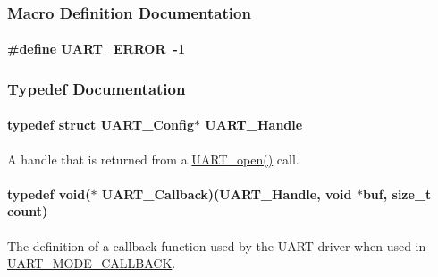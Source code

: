 \subsubsection{Macro Definition Documentation}
\paragraph[{U\-A\-R\-T\-\_\-\-E\-R\-R\-O\-R}]{\setlength{\rightskip}{0pt plus 5cm}\#define U\-A\-R\-T\-\_\-\-E\-R\-R\-O\-R~-\/1}\label{_u_a_r_t_8h_a7e3562e7931cf51b41a32d8109072251}


\subsubsection{Typedef Documentation}
\paragraph[{U\-A\-R\-T\-\_\-\-Handle}]{\setlength{\rightskip}{0pt plus 5cm}typedef struct {\bf U\-A\-R\-T\-\_\-\-Config}$\ast$ {\bf U\-A\-R\-T\-\_\-\-Handle}}\label{_u_a_r_t_8h_a13cc669fae768d8212e6491ce71b28af}


A handle that is returned from a \hyperlink{_u_a_r_t_8h_a0442ea1ec23901168da31726bb3254c1}{U\-A\-R\-T\-\_\-open()} call. 

\paragraph[{U\-A\-R\-T\-\_\-\-Callback}]{\setlength{\rightskip}{0pt plus 5cm}typedef void($\ast$ U\-A\-R\-T\-\_\-\-Callback)({\bf U\-A\-R\-T\-\_\-\-Handle}, void $\ast$buf, size\-\_\-t count)}\label{_u_a_r_t_8h_a74c489f070c575fb11654fe74302b5b8}


The definition of a callback function used by the U\-A\-R\-T driver when used in \hyperlink{_u_a_r_t_8h_a2507a620dba95cd20885c52494d19e90ae0dbd9b5195e56c3c2aed10163523754}{U\-A\-R\-T\-\_\-\-M\-O\-D\-E\-\_\-\-C\-A\-L\-L\-B\-A\-C\-K}. 


